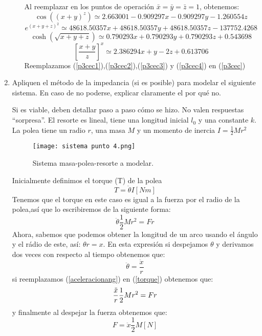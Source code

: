 \documentclass[letterpaper, 12pt]{article}
\begin{document}
\begin{enumerate}
\begin{enumerate}
 Al reemplazar en los puntos de operación $ \bar{x} = \bar{y} = \bar{z} = 1$, obtenemos: 
\begin{equation}
    \cos((x+y)^z)\simeq 2.663001-0.909297x-0.909297y-1.260554z
    \label{p3cec1}
\end{equation}
\begin{equation}
     e^{(x+y+z)^2}\simeq 48618.50357x+48618.50357y+48618.50357z-137752.4268
     \label{p3cec2}
\end{equation}
\begin{equation}
     \cosh(\sqrt{x+y+z})\simeq 0.790293x+0.790293y+0.790293z+0.543698
     \label{p3cec3}
\end{equation}
\begin{equation}
     \left[\frac{x+y}{z}\right]^x\simeq 2.386294x+y-2z+0.613706
     \label{p3cec4}
\end{equation}
Reemplazamos (\ref{p3cec1}),(\ref{p3cec2}),(\ref{p3cec3}) y (\ref{p3cec4}) en (\ref{p3cec})



\end{enumerate}
\item Apliquen el método de la impedancia (si es posible) para modelar el siguiente sistema. En caso de no poderse, explicar claramente el por qué no.

Si es viable, deben detallar paso a paso cómo se hizo. No valen respuestas “sorpresa”. El resorte es lineal, tiene una longitud inicial $l_0$ y una constante $k$. La polea tiene un radio $r$, una masa $M$ y un momento de inercia $I = \frac{1}{2}Mr^2$
\begin{figure}[H]
    \centering
    \texttt{[image: sistema punto 4.png]}
    \caption{Sistema masa-polea-resorte a modelar.}
    \label{fig:sistema punto 4}
\end{figure}

Inicialmente definimos el torque (T) de la polea
    \begin{equation}
    T=\ddot{\theta}I \left[Nm\right]
    \end{equation}
Tenemos que el torque en este caso es igual a la fuerza por el radio de la polea,así que lo escribiremos de la siguiente forma:
    \begin{equation}
    \ddot{\theta}\frac{1}{2}Mr^2=Fr
    \label{torque}
    \end{equation}
Ahora, sabemos que podemos obtener la longitud de un arco usando el ángulo y el rádio de este, así: $\theta r=x$.
En esta expresión si despejamos $\theta$ y derivamos dos veces con respecto al tiempo obtenemos que:
    \begin{equation}
    \ddot{\theta}=\frac{\ddot{x}}{r}
    \label{aceleracionang}
    \end{equation}
si reemplazamos (\ref{aceleracionang}) en (\ref{torque}) obtenemos que:
\begin{equation}
\notag
   \frac{\ddot{x}}{r}\frac{1}{2}Mr^2=Fr
    \end{equation}
y finalmente al despejar la fuerza obtenemos que: 
\begin{equation}
   F=\ddot{x}\frac{1}{2}M  \left[N\right]
    \end{equation}
    

\end{enumerate}
\end{document}
